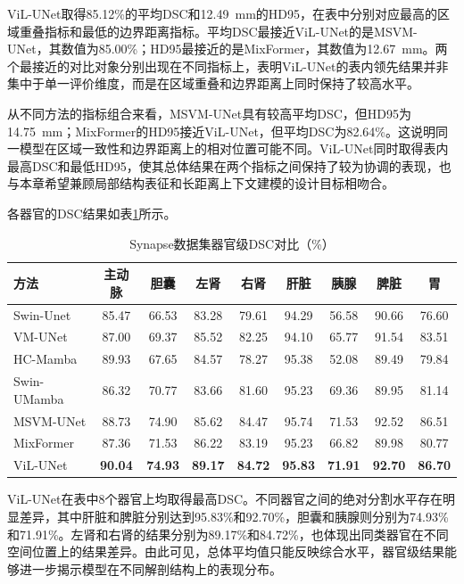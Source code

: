 ViL-UNet取得85.12\%的平均DSC和12.49~mm的HD95，在表中分别对应最高的区域重叠指标和最低的边界距离指标。平均DSC最接近ViL-UNet的是MSVM-UNet，其数值为85.00\%；HD95最接近的是MixFormer，其数值为12.67~mm。两个最接近的对比对象分别出现在不同指标上，表明ViL-UNet的表内领先结果并非集中于单一评价维度，而是在区域重叠和边界距离上同时保持了较高水平。

从不同方法的指标组合来看，MSVM-UNet具有较高平均DSC，但HD95为14.75~mm；MixFormer的HD95接近ViL-UNet，但平均DSC为82.64\%。这说明同一模型在区域一致性和边界距离上的相对位置可能不同。ViL-UNet同时取得表内最高DSC和最低HD95，使其总体结果在两个指标之间保持了较为协调的表现，也与本章希望兼顾局部结构表征和长距离上下文建模的设计目标相吻合。

各器官的DSC结果如表\ref{tab:ch3-synapse-organ}所示。

\begin{table}[htbp]
  \centering
  \caption{Synapse数据集器官级DSC对比（\%）}
  \label{tab:ch3-synapse-organ}
  \small
  \setlength{\tabcolsep}{3.2pt}
  \begin{tabular}{lcccccccc}
    \hline
    方法 & 主动脉 & 胆囊 & 左肾 & 右肾 & 肝脏 & 胰腺 & 脾脏 & 胃 \\
    \hline
    Swin-Unet   & 85.47 & 66.53 & 83.28 & 79.61 & 94.29 & 56.58 & 90.66 & 76.60 \\
    VM-UNet     & 87.00 & 69.37 & 85.52 & 82.25 & 94.10 & 65.77 & 91.54 & 83.51 \\
    HC-Mamba    & 89.93 & 67.65 & 84.57 & 78.27 & 95.38 & 52.08 & 89.49 & 79.84 \\
    Swin-UMamba & 86.32 & 70.77 & 83.66 & 81.60 & 95.23 & 69.36 & 89.95 & 81.14 \\
    MSVM-UNet   & 88.73 & 74.90 & 85.62 & 84.47 & 95.74 & 71.53 & 92.52 & 86.51 \\
    MixFormer   & 87.36 & 71.53 & 86.22 & 83.19 & 95.23 & 66.82 & 89.98 & 80.77 \\
    ViL-UNet    & \textbf{90.04} & \textbf{74.93} & \textbf{89.17} & \textbf{84.72} & \textbf{95.83} & \textbf{71.91} & \textbf{92.70} & \textbf{86.70} \\
    \hline
  \end{tabular}
\end{table}

ViL-UNet在表中8个器官上均取得最高DSC。不同器官之间的绝对分割水平存在明显差异，其中肝脏和脾脏分别达到95.83\%和92.70\%，胆囊和胰腺则分别为74.93\%和71.91\%。左肾和右肾的结果分别为89.17\%和84.72\%，也体现出同类器官在不同空间位置上的结果差异。由此可见，总体平均值只能反映综合水平，器官级结果能够进一步揭示模型在不同解剖结构上的表现分布。

